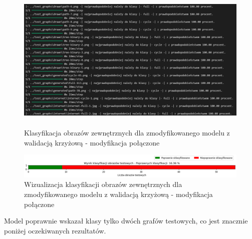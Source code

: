 \begin{figure}[ht]
	\centering
	\includegraphics[height=7cm]{resources/tests/images/v4/crossvalid_txt.png}
	\caption{Klasyfikacja obrazów zewnętrznych dla zmodyfikowanego modelu z walidacją krzyżową - modyfikacja połączone}
	\label{Fig:tests-cv-5b}
\end{figure}
\FloatBarrier

\begin{figure}[ht]
	\centering
	\includegraphics[width=14cm]{resources/tests/images/v4/crossvalid_bar.png}
	\caption{Wizualizacja klasyfikacji obrazów zewnętrznych dla zmodyfikowanego modelu z walidacją krzyżową - modyfikacja połączone}
	\label{Fig:tests-cv-5c}
\end{figure}
\FloatBarrier

Model poprawnie wskazał klasy tylko dwóch grafów testowych, co jest znacznie poniżej oczekiwanych rezultatów.